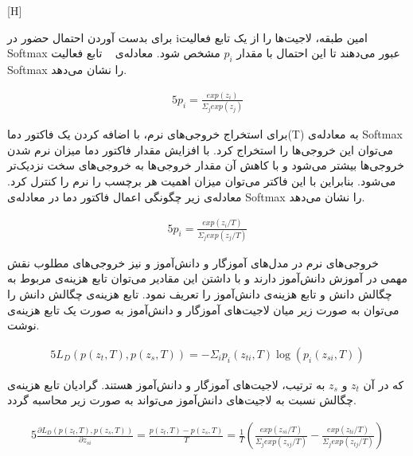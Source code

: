 [H]

برای بدست آوردن احتمال حضور در iامین طبقه، لاجیت‌ها را از یک تابع فعالیت Softmax عبور می‌دهند تا این احتمال با مقدار $p_i$ مشخص شود. معادله‌ی ~ تابع فعالیت Softmax را نشان می‌دهد.

\begin{alignat}{5}
	p_i = \frac{exp(z_i)}{\Sigma_j exp(z_j)}    \label{softmax} 
\end{alignat}

برای استخراج خروجی‌های نرم، با اضافه کردن یک فاکتور دما(T) به معادله‌ی Softmax می‌توان این خروجی‌ها را استخراج کرد. با افزایش مقدار فاکتور دما میزان نرم‌ شدن خروجی‌ها بیشتر می‌شود و با کاهش آن مقدار خروجی‌ها به خروجی‌های سخت نزدیک‌تر می‌شود. بنابراین با این فاکتر می‌توان میزان اهمیت هر برچسب را نرم را کنترل کرد. معادله‌ی زیر چگونگی اعمال فاکتور دما در معادله‌ی Softmax را نشان می‌دهد.

\begin{alignat}{5}
	p_i = \frac{exp(z_i/T)}{\Sigma_j exp(z_j/T)}    \label{softsoftmax} 
\end{alignat}

خروجی‌های نرم در مدل‌های آموزگار و دانش‌آموز و نیز خروجی‌های مطلوب نقش مهمی در آموزش دانش‌آموز دارند و با داشتن این مقادیر می‌توان تابع‌ هزینه‌ی مربوط به چگالش دانش و 
تابع هزینه‌ی دانش‌آموز را تعریف نمود. تابع هزینه‌ی چگالش دانش را می‌توان به صورت زیر میان لاجیت‌های آموز‌گار و دانش‌آموز به صورت یک تابع هزینه‌ی  نوشت. 

\begin{alignat}{5}
	L_D(p(z_t,T), p(z_s,T)) = -\Sigma_i p_i(z_{ti},T) \log(p_i(z_{si},T))    \label{ld} 
\end{alignat}

که در آن $z_t$ و $z_s$ به ترتیب، لاجیت‌های آموزگار و دانش‌آموز هستند. گرادیان تابع‌ هزینه‌ی چگالش نسبت به لاجیت‌های دانش‌آموز می‌تواند به صورت زیر محاسبه گردد.

\begin{alignat}{5}
	\frac{\partial L_D(p(z_t,T), p(z_s,T))}{\partial z_{si}} = \frac{p(z_t,T) - p(z_s,T)}{T}    
	= \frac{1}{T}(\frac{exp(z_{si}/T)}{\Sigma_j exp(z_{sj}/T)}  -\frac{exp(z_{ti}/T)}{\Sigma_j exp(z_{tj}/T)}) \label{gradld}
\end{alignat}

